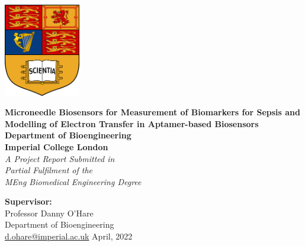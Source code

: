 \begin{titlepage}

\begin{center}

\includegraphics[width=0.25\textwidth]{img/collegecrest.png}\\
\vspace{3em}

\huge\textbf{Microneedle Biosensors for Measurement of Biomarkers for Sepsis and Modelling of Electron Transfer in Aptamer-based Biosensors}\\
\vspace{1em}
{\Large{\textbf{Department of Bioengineering \\ Imperial College London}}}\\[0.5in]

{\large\emph{A Project Report Submitted in \\Partial Fulfilment of the\\ MEng Biomedical Engineering Degree}}
\vspace{1in}

      
\normalsize {\textbf{Supervisor:}} \\
Professor Danny O'Hare\\
\vspace{1em}
Department of Bioengineering\\
\url{d.ohare@imperial.ac.uk}
\vfill
April, 2022
\end{center}
\end{titlepage}
